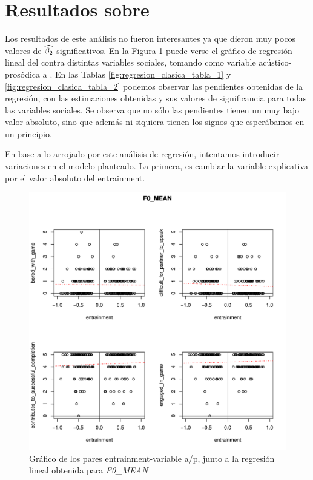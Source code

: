 \section{Resultados sobre \entrainment}

Los resultados de este análisis no fueron interesantes ya que dieron muy pocos valores de $\widehat{\beta_2}$ significativos. En la Figura \ref{fig:regresion_clasica} puede verse el gráfico de regresión lineal del \entrainment contra distintas variables sociales, tomando como variable acústico-prosódica a \FOMEAN. En las Tablas \ref{fig:regresion_clasica_tabla_1} y \ref{fig:regresion_clasica_tabla_2} podemos observar las pendientes obtenidas de la regresión, con las estimaciones obtenidas y sus valores de significancia para todas las variables sociales. Se observa que no sólo las pendientes tienen un muy bajo valor absoluto, sino que además ni siquiera tienen los signos que esperábamos en un principio.

En base a lo arrojado por este análisis de regresión, intentamos introducir variaciones en el modelo planteado. La primera, es cambiar la variable explicativa por el valor absoluto del entrainment.


\begin{figure}[t!]
\includegraphics[width=15cm]{images/regression_F0_MEAN_1.pdf}
\caption{Gráfico de los pares entrainment-variable a/p, junto a la regresión lineal obtenida para \emph{F0\_MEAN}}
\label{fig:regresion_clasica}
\end{figure}


